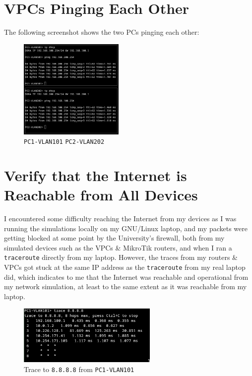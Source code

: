 \documentclass[a4paper]{article}
\begin{document}
\section{VPCs Pinging Each Other}
The following screenshot shows the two PCs pinging each other:
\begin{figure}[H]
    \centering
    \includegraphics[width=0.45\textwidth]{./images/ping_pcs.png}
    \caption{\texttt{PC1-VLAN101} {\leftrightarrow} \texttt{PC2-VLAN202}}
\end{figure}

\section{Verify that the Internet is Reachable from All Devices}
I encountered some difficulty reaching the Internet from my devices as I was running the simulations locally on 
my GNU/Linux laptop, and my packets were getting blocked at some point by the University's firewall, both from my 
simulated devices such as the VPCs \& MikroTik routers, and when I ran a \verb|traceroute| directly from my 
laptop. 
However, the traces from my routers \& VPCs got stuck at the same IP address as the \verb|traceroute| from my real 
laptop did, which indicates to me that the Internet was reachable and operational from my network simulation, at 
least to the same extent as it was reachable from my laptop.


\begin{figure}[H]
    \centering
    \includegraphics[width=0.6\textwidth]{./images/pc1_ping_internet.png}
    \caption{Trace to \texttt{8.8.8.8} from \texttt{PC1-VLAN101}}
\end{figure}
\end{document}
